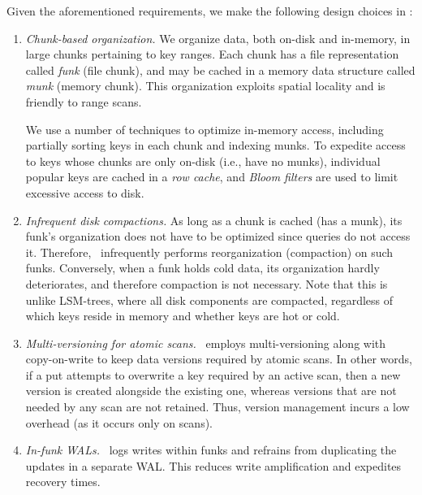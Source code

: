 
Given the aforementioned requirements, we make the following design choices in \sys:

\begin{enumerate}\itemsep0pt
\item \emph{Chunk-based organization.}
We organize data, both on-disk and in-memory,  in large chunks pertaining to  key ranges.  
Each chunk has a file representation called  \emph{funk} (file chunk), and may be cached in a  memory data structure called \emph{munk} (memory chunk).
This organization exploits spatial locality and is friendly to range scans.

We use a number of techniques to optimize in-memory  access, including partially sorting keys in each chunk and 
indexing munks. 
To expedite access to  keys whose chunks are only on-disk  (i.e., have no munks), 
individual popular keys are cached in a \emph{row cache}, 
and \emph{Bloom filters} are used to limit excessive access to disk. 

\item \emph{Infrequent disk compactions.}
As long as a chunk is cached (has a munk), its funk's organization does not have to be optimized since 
queries do not access it. Therefore, \sys\ infrequently performs reorganization (compaction) on such funks.
Conversely, when a funk holds cold data, its organization hardly deteriorates, and therefore compaction is not necessary.
Note that this is unlike LSM-trees, where all disk components are compacted, regardless of which keys reside in memory and whether 
keys are hot or cold. 

\item \emph{Multi-versioning for atomic scans.}
\sys\ employs multi-versioning along with
copy-on-write to keep data versions required by atomic scans. 
In other words, if a put attempts to overwrite a key  required by an active scan, then a new version is created alongside the 
existing one, whereas versions that are not needed by any scan are not retained. 
Thus, version management incurs a low overhead (as it occurs only on scans). 

\item \emph{In-funk WALs.}
\sys\ logs writes within funks and refrains from duplicating the updates  in a separate WAL. This reduces write amplification and expedites recovery times. 
\end{enumerate}

